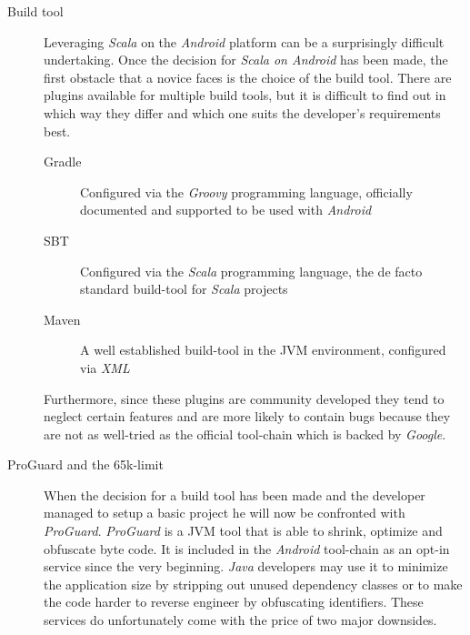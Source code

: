 \begin{description}

	\item[Build tool]\hfill

	Leveraging \textit{Scala} on the \textit{Android} platform can be a surprisingly difficult undertaking. Once the decision for \textit{Scala on Android} has been made, the  first obstacle that a novice faces is the choice of the build tool. There are plugins available for multiple build tools, but it is difficult to find out in which way they differ and which one suits the developer's requirements best.

	\begin{description}

		\item[Gradle]\hfill

		Configured via the \textit{Groovy} programming language, officially documented and supported to be used with \textit{Android}

		\item[\ac{SBT}]\hfill

		Configured via the \textit{Scala} programming language, the de facto standard build-tool for \textit{Scala} projects

		\item[Maven]\hfill

		A well established build-tool in the \ac{JVM} environment, configured via \textit{XML}

	\end{description}

	Furthermore, since these plugins are community developed they tend to neglect certain features and are more likely to contain bugs because they are not as well-tried as the official tool-chain which is backed by \textit{Google}.

	\item[ProGuard and the 65k-limit]\hfill

	When the decision for a build tool has been made and the developer managed to setup a basic project he will now be confronted with \textit{ProGuard}. \textit{ProGuard} is a \ac{JVM} tool that is able to shrink, optimize and obfuscate byte code. It is included in the \textit{Android} tool-chain as an opt-in service since the very beginning. \textit{Java} developers may use it to minimize the application size by stripping out unused dependency classes or to make the code harder to reverse engineer by obfuscating identifiers. These services do unfortunately come with the price of two major downsides.


\end{description}
